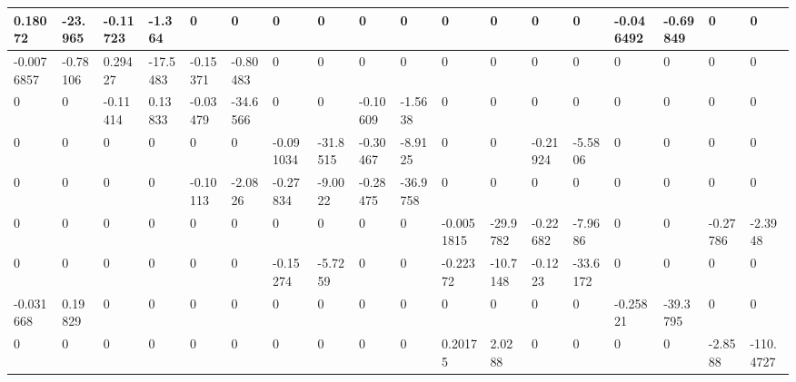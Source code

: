 \begin{tabular}{|l|l|l|l|l|l|l|l|l|l|l|l|l|l|l|l|l|l|}
\hline
0.18072&-23.965&-0.11723&-1.364&0&0&0&0&0&0&0&0&0&0&-0.046492&-0.69849&0&0\\\hline
-0.0076857&-0.78106&0.29427&-17.5483&-0.15371&-0.80483&0&0&0&0&0&0&0&0&0&0&0&0\\\hline
0&0&-0.11414&0.13833&-0.03479&-34.6566&0&0&-0.10609&-1.5638&0&0&0&0&0&0&0&0\\\hline
0&0&0&0&0&0&-0.091034&-31.8515&-0.30467&-8.9125&0&0&-0.21924&-5.5806&0&0&0&0\\\hline
0&0&0&0&-0.10113&-2.0826&-0.27834&-9.0022&-0.28475&-36.9758&0&0&0&0&0&0&0&0\\\hline
0&0&0&0&0&0&0&0&0&0&-0.0051815&-29.9782&-0.22682&-7.9686&0&0&-0.27786&-2.3948\\\hline
0&0&0&0&0&0&-0.15274&-5.7259&0&0&-0.22372&-10.7148&-0.1223&-33.6172&0&0&0&0\\\hline
-0.031668&0.19829&0&0&0&0&0&0&0&0&0&0&0&0&-0.25821&-39.3795&0&0\\\hline
0&0&0&0&0&0&0&0&0&0&0.20175&2.0288&0&0&0&0&-2.8588&-110.4727\\\hline
\end{tabular}
